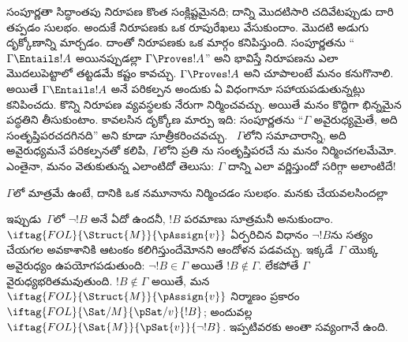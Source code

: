 \documentclass[../../../include/open-logic-section]{subfiles}
\begin{document}
      {}
      {}


సంపూర్ణతా సిద్ధాంతపు నిరూపణ కొంత సంక్లిష్టమైనది; దాన్ని మొదటిసారి
చదివేటప్పుడు దారి తప్పడం సులభం. అందుకే నిరూపణకు ఒక రూపురేఖలు
వేసుకుందాం. మొదటి అడుగు దృక్కోణాన్ని మార్చడం. దాంతో నిరూపణకు ఒక మార్గం కనిపిస్తుంది. సంపూర్ణతను ``$\Gamma \Entails !A$ అయినప్పుడల్లా
$\Gamma \Proves !A$'' అని భావిస్తే నిరూపణను ఎలా మొదలుపెట్టాలో తట్టడమే కష్టం కావచ్చు. $\Gamma \Proves !A$ అని చూపాలంటే మనం 
కనుగొనాలి. అయితే $\Gamma \Entails !A$ అనే పరికల్పన అందుకు ఏ విధంగానూ
సహాయపడుతున్నట్లు కనిపించదు. కొన్ని నిరూపణ వ్యవస్థలకు నేరుగా
 నిర్మించవచ్చు. అయితే మనం కొద్దిగా భిన్నమైన పద్ధతిని
తీసుకుంటాం. కావలసిన దృక్కోణ మార్పు ఇది: సంపూర్ణతను ``$\Gamma$
అవైరుధ్యమైతే, అది సంతృప్తిపరచదగినది'' అని కూడా సూత్రీకరించవచ్చు.
~$\Gamma$లోని సమాచారాన్ని, అది అవైరుధ్యమనే పరికల్పనతో కలిపి,
$\Gamma$లోని ప్రతి ను
సంతృప్తిపరచే ను మనం
నిర్మించగలమేమో. ఎంతైనా, మనం వెతుకుతున్న
 ఎలాంటిదో తెలుసు:
$\Gamma$ దాన్ని ఎలా వర్ణిస్తుందో సరిగ్గా అలాంటిదే!{}

$\Gamma$లో 
మాత్రమే ఉంటే, దానికి ఒక నమూనాను నిర్మించడం సులభం.
మనకు చేయవలసిందల్లా

ఇప్పుడు~$\Gamma$లో $\lnot !B$ అనే ఏదో  ఉందనీ, $!B$
పరమాణు సూత్రమనీ అనుకుందాం. $\iftag{FOL}{\Struct{M}}{\pAssign{v}}$
ఏర్పరిచిన విధానం $\lnot !B$ను సత్యం చేయగల అవకాశానికి ఆటంకం కలిగిస్తుందేమోనని
ఆందోళన పడవచ్చు. ఇక్కడే~$\Gamma$ యొక్క అవైరుధ్యం ఉపయోగపడుతుంది:
$\lnot !B \in \Gamma$ అయితే $!B \notin \Gamma$. లేకపోతే $\Gamma$
వైరుధ్యభరితమవుతుంది. $!B \notin \Gamma$ అయితే, మన
$\iftag{FOL}{\Struct{M}}{\pAssign{v}}$ నిర్మాణం ప్రకారం
$\iftag{FOL}{\Sat/{M}}{\pSat/{v}}{!B}$; అందువల్ల
$\iftag{FOL}{\Sat{M}}{\pSat{v}}{\lnot !B}$. ఇప్పటివరకు అంతా సవ్యంగానే
ఉంది.
\end{document}
